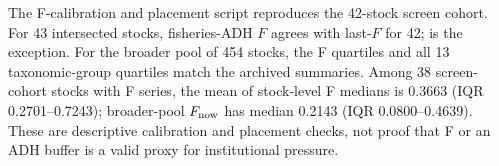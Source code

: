 The F-calibration and placement script reproduces the 42-stock screen cohort. For 43 intersected stocks, fisheries-ADH \(F\) agrees with last-\(F\) for 42; \texttt{} is the exception. For the broader pool of 454 stocks, the F quartiles and all 13 taxonomic-group quartiles match the archived summaries. Among 38 screen-cohort stocks with F series, the mean of stock-level F medians is 0.3663 (IQR 0.2701--0.7243); broader-pool \(F_{\rm now}\) has median 0.2143 (IQR 0.0800--0.4639). These are descriptive calibration and placement checks, not proof that F or an ADH buffer is a valid proxy for institutional pressure.



